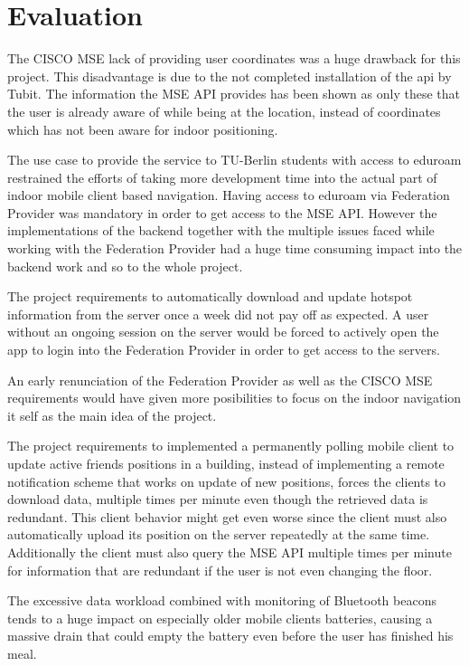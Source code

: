 \chapter{Evaluation}
\label{cha:evaluation}


The CISCO MSE lack of providing user coordinates was a huge drawback for this project. This disadvantage is due to the not completed installation of the api by Tubit. The information the MSE API provides has been shown as only these that the user is already aware of while being at the location, instead of coordinates which has not been aware for indoor positioning.

The use case to provide the service to TU-Berlin students with access to eduroam restrained the efforts of taking more development time into the actual part of indoor mobile client based navigation. Having access to eduroam via Federation Provider was mandatory in order to get access to the MSE API. However the implementations of the backend together with the multiple issues faced while working with the Federation Provider had a huge time consuming impact into the backend work and so to the whole project. 

The project requirements to automatically download and update hotspot information from the server once a week did not pay off as expected. A user without an ongoing session on the server would be forced to actively open the app to login into the Federation Provider in order to get access to the servers. 

An early renunciation of the Federation Provider as well as the CISCO MSE requirements would have given more posibilities to focus on the indoor navigation it self as the main idea of the project.



The project requirements to implemented a permanently polling mobile client to update 
 active friends positions in a building, instead of implementing a remote notification scheme that works on update of new positions, forces the clients to download data, multiple times per minute even though the retrieved data is redundant.
This client behavior might get even worse since the client must also automatically upload its position on the server repeatedly at the same time. Additionally the client must also query the MSE API multiple times per minute for information that are redundant if the user is not even changing the floor.
  
  The excessive data workload combined with monitoring of Bluetooth beacons tends to a huge impact on 
especially older mobile clients batteries, causing a massive drain that could empty the battery even before the user has finished his meal.



